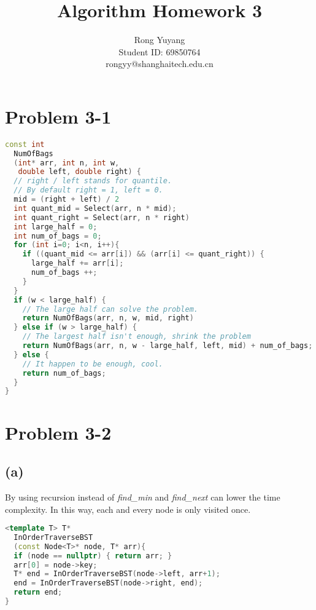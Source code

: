 \documentclass{article}
\title{Algorithm Homework 3}
\author{Rong Yuyang \\ Student ID: 69850764 \\ rongyy@shanghaitech.edu.cn}
\begin{document}
\maketitle

\section*{Problem 3-1}
\begin{lstlisting}[language = C++]
const int 
  NumOfBags
  (int* arr, int n, int w, 
   double left, double right) {
  // right / left stands for quantile.
  // By default right = 1, left = 0.
  mid = (right + left) / 2
  int quant_mid = Select(arr, n * mid);
  int quant_right = Select(arr, n * right)
  int large_half = 0;
  int num_of_bags = 0;
  for (int i=0; i<n, i++){
    if ((quant_mid <= arr[i]) && (arr[i] <= quant_right)) {
      large_half += arr[i];
      num_of_bags ++;
    }
  }
  if (w < large_half) {
    // The large half can solve the problem.
    return NumOfBags(arr, n, w, mid, right)
  } else if (w > large_half) {
    // The largest half isn't enough, shrink the problem
    return NumOfBags(arr, n, w - large_half, left, mid) + num_of_bags;
  } else {
    // It happen to be enough, cool.
    return num_of_bags;
  }
}
\end{lstlisting}  
\section*{Problem 3-2}
  \subsection*{(a)}
  By using recursion instead of \textit{find\_min} and \textit{find\_next} can lower the time complexity. In this way, each and every node is only visited once.
\begin{lstlisting}[language = C++]
<template T> T*
  InOrderTraverseBST
  (const Node<T>* node, T* arr){
  if (node == nullptr) { return arr; }
  arr[0] = node->key;
  T* end = InOrderTraverseBST(node->left, arr+1);
  end = InOrderTraverseBST(node->right, end);
  return end;
}
\end{lstlisting}   
\end{document}
